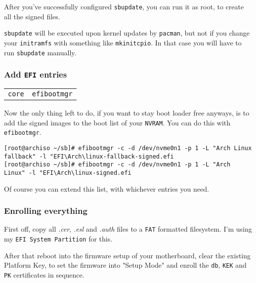 \documentclass[9pt]{report}
\newenvironment{NOTE}
{\begin{tcolorbox}[colback=admonitionBG,coltitle=draculaFG,colframe=draculaBlue,colbacktitle=draculaBlue,title=NOTE]}
{\end{tcolorbox}}
\newenvironment{packagetable}
{\begin{longtabu}to \textwidth [b]{X[1,r]|X[1,l]}}
{\end{longtabu}}
\begin{document}
After you’ve successfully configured \texttt{sbupdate}, you can run it as root, to create all the signed files.


\begin{NOTE}
    \texttt{sbupdate} will be executed upon kernel updates by \texttt{pacman}, but not if you change your \texttt{initramfs} with something like \texttt{mkinitcpio}.
    In that case you will have to run \texttt{sbupdate} manually.

\end{NOTE}

\newpage

\hypertarget{x-add-efi-entries}{\subsubsection{Add \texttt{EFI} entries}}
\begin{packagetable}
    \texttt{core} & \texttt{efibootmgr} \\ 
\end{packagetable}

Now the only thing left to do, if you want to stay boot loader free anyways, is to add the signed images to the boot list of your \texttt{NVRAM}.
You can do this with \texttt{efibootmgr}.


\begin{verbatim}
[root@archiso ~/sb]# efibootmgr -c -d /dev/nvme0n1 -p 1 -L "Arch Linux fallback" -l "EFI\Arch\linux-fallback-signed.efi
[root@archiso ~/sb]# efibootmgr -c -d /dev/nvme0n1 -p 1 -L "Arch Linux" -l "EFI\Arch\linux-signed.efi
\end{verbatim}

Of course you can extend this list, with whichever entries you need.



\newpage

\hypertarget{x-enrolling-everything}{\subsubsection{Enrolling everything}}
First off, copy all \textit{.cer}, \textit{.esl} and \textit{.auth} files to a \texttt{FAT} formatted filesystem.
I’m using my \texttt{EFI System Partition} for this.


After that reboot into the firmware setup of your motherboard, clear the existing Platform Key, to set the firmware into "Setup Mode" and enroll the \texttt{db}, \texttt{KEK} and \texttt{PK} certificates in sequence.
\end{document}
